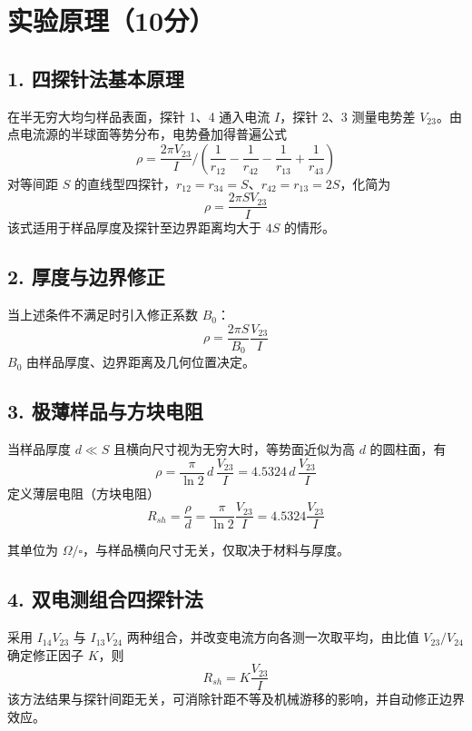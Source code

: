 \documentclass[12pt,a4paper]{ctexart}
\begin{document}
\section*{实验原理（10分）}

\subsection*{1. 四探针法基本原理}
在半无穷大均匀样品表面，探针 1、4 通入电流 $I$，探针 2、3 测量电势差 $V_{23}$。由点电流源的半球面等势分布，电势叠加得普遍公式
\begin{equation}
\rho=\frac{2\pi V_{23}}{I}\Big/\left(\frac{1}{r_{12}}-\frac{1}{r_{42}}-\frac{1}{r_{13}}+\frac{1}{r_{43}}\right)
\end{equation}
对等间距 $S$ 的直线型四探针，$r_{12}=r_{34}=S$、$r_{42}=r_{13}=2S$，化简为
\begin{equation}
\rho=\frac{2\pi S V_{23}}{I}
\end{equation}
该式适用于样品厚度及探针至边界距离均大于 $4S$ 的情形。

\subsection*{2. 厚度与边界修正}
当上述条件不满足时引入修正系数 $B_0$：
\begin{equation}
\rho=\frac{2\pi S}{B_0}\frac{V_{23}}{I}
\end{equation}
$B_0$ 由样品厚度、边界距离及几何位置决定。

\subsection*{3. 极薄样品与方块电阻}
当样品厚度 $d\ll S$ 且横向尺寸视为无穷大时，等势面近似为高 $d$ 的圆柱面，有
\begin{equation}
\rho=\frac{\pi}{\ln 2}\,d\,\frac{V_{23}}{I}=4.5324\,d\,\frac{V_{23}}{I}
\end{equation}
定义薄层电阻（方块电阻）
\begin{equation}
R_{sh}=\frac{\rho}{d}=\frac{\pi}{\ln 2}\frac{V_{23}}{I}=4.5324\frac{V_{23}}{I}
\end{equation}

其单位为 $\Omega/\square$，与样品横向尺寸无关，仅取决于材料与厚度。

\subsection*{4. 双电测组合四探针法}
采用 $I_{14}V_{23}$ 与 $I_{13}V_{24}$ 两种组合，并改变电流方向各测一次取平均，由比值 $V_{23}/V_{24}$ 确定修正因子 $K$，则
\begin{equation}
R_{sh}=K\frac{V_{23}}{I}
\end{equation}
该方法结果与探针间距无关，可消除针距不等及机械游移的影响，并自动修正边界效应。
\end{document}
